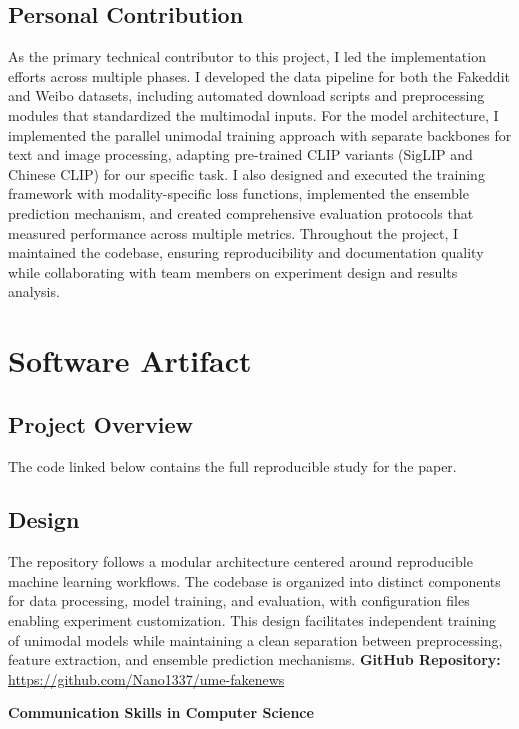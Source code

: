 \documentclass[12pt,letterpaper]{report}
\newcommand{\sectiondivider}[1]{%
    \clearpage
    \thispagestyle{empty}
    \begin{center}
        \vspace*{\fill}
        {\Huge\bfseries\textcolor{vanderbiltblack}{#1}}
        \vspace*{\fill}
    \end{center}
    \clearpage
}
\begin{document}
\subsection{Personal Contribution}
As the primary technical contributor to this project, I led the implementation efforts across multiple phases. I developed the data pipeline for both the Fakeddit and Weibo datasets, including automated download scripts and preprocessing modules that standardized the multimodal inputs. For the model architecture, I implemented the parallel unimodal training approach with separate backbones for text and image processing, adapting pre-trained CLIP variants (SigLIP and Chinese CLIP) for our specific task. I also designed and executed the training framework with modality-specific loss functions, implemented the ensemble prediction mechanism, and created comprehensive evaluation protocols that measured performance across multiple metrics. Throughout the project, I maintained the codebase, ensuring reproducibility and documentation quality while collaborating with team members on experiment design and results analysis.

\section{Software Artifact}
\subsection{Project Overview}
The code linked below contains the full reproducible study for the paper. 

\subsection{Design}
The repository follows a modular architecture centered around reproducible machine learning workflows. The codebase is organized into distinct components for data processing, model training, and evaluation, with configuration files enabling experiment customization. This design facilitates independent training of unimodal models while maintaining a clean separation between preprocessing, feature extraction, and ensemble prediction mechanisms.
\textbf{GitHub Repository:} \url{https://github.com/Nano1337/ume-fakenews}



\sectiondivider{Communication Skills in Computer Science}
\end{document}
